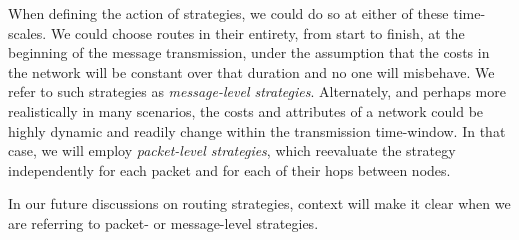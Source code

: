When defining the action of strategies, we could do so at either of these time-scales. We could choose routes in their entirety, from start to finish, at the beginning of the message transmission, under the assumption that the costs in the network will be constant over that duration and no one will misbehave. We refer to such strategies as \textit{message-level strategies}. Alternately, and perhaps more realistically in many scenarios, the costs and attributes of a network could be highly dynamic and readily change within the transmission time-window. In that case, we will employ \textit{packet-level strategies}, which reevaluate the strategy independently for each packet and for each of their hops between nodes.

In our future discussions on routing strategies, context will make it clear when we are referring to packet- or message-level strategies.